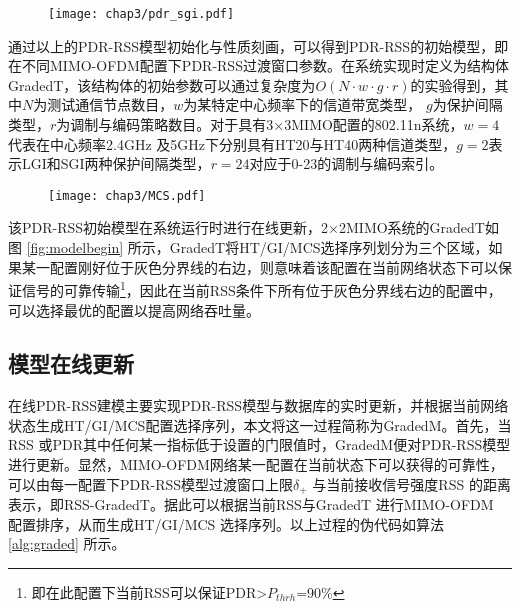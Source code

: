 \begin{figure}[!htp]
\centering
    \texttt{[image: chap3/pdr\_sgi.pdf]}
\end{figure}

通过以上的PDR-RSS模型初始化与性质刻画，可以得到PDR-RSS的初始模型，即在不同MIMO-OFDM配置下PDR-RSS过渡窗口参数。在系统实现时定义为结构体GradedT，该结构体的初始参数可以通过复杂度为$\textit{O}(N \cdot w \cdot g \cdot r)$的实验得到，其中$N$为测试通信节点数目，$w$为某特定中心频率下的信道带宽类型， $g$为保护间隔类型，$r$为调制与编码策略数目。对于具有3$\times$3MIMO配置的802.11n系统，$w=4$代表在中心频率2.4GHz 及5GHz下分别具有HT20与HT40两种信道类型，$g=2$表示LGI和SGI两种保护间隔类型，$r=24$对应于0-23的调制与编码索引。

\begin{figure}[!htp]
\centering
    \texttt{[image: chap3/MCS.pdf]}
\end{figure}

该PDR-RSS初始模型在系统运行时进行在线更新，2$\times$2MIMO系统的GradedT如图 \ref{fig:modelbegin} 所示，GradedT将HT/GI/MCS选择序列划分为三个区域，如果某一配置刚好位于灰色分界线的右边，则意味着该配置在当前网络状态下可以保证信号的可靠传输\footnote{即在此配置下当前RSS可以保证PDR>$P_{thrh}$=90\%}，因此在当前RSS条件下所有位于灰色分界线右边的配置中，可以选择最优的配置以提高网络吞吐量。

\subsection{模型在线更新}
\label{sec:update}

在线PDR-RSS建模主要实现PDR-RSS模型与数据库的实时更新，并根据当前网络状态生成HT/GI/MCS配置选择序列，本文将这一过程简称为GradedM。首先，当RSS 或PDR其中任何某一指标低于设置的门限值时，GradedM便对PDR-RSS模型进行更新。显然，MIMO-OFDM网络某一配置在当前状态下可以获得的可靠性，可以由每一配置下PDR-RSS模型过渡窗口上限$\delta_+$ 与当前接收信号强度RSS 的距离表示，即RSS-GradedT。据此可以根据当前RSS与GradedT 进行MIMO-OFDM 配置排序，从而生成HT/GI/MCS 选择序列。以上过程的伪代码如算法 \ref{alg:graded} 所示。

